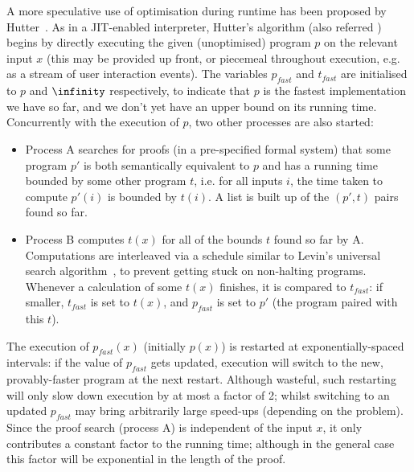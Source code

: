 A more speculative use of optimisation during runtime has been proposed by
Hutter~\iffalse TODO: Cite \fi. As in a JIT-enabled interpreter, Hutter's
algorithm (also referred \hsearch{}) begins by directly executing the given
(unoptimised) program $p$ on the relevant input $x$ (this may be provided up
front, or piecemeal throughout execution, e.g. as a stream of user interaction
events). The variables $p_{fast}$ and $t_{fast}$ are initialised to $p$ and
$\infinity$ respectively, to indicate that $p$ is the fastest implementation we
have so far, and we don't yet have an upper bound on its running
time. Concurrently with the execution of $p$, two other processes are also
started:

\begin{itemize}
\item Process A searches for proofs (in a pre-specified formal system) that some
  program $p\prime$ is both semantically equivalent to $p$ and has a running
  time bounded by some other program $t$, i.e. for all inputs $i$, the
  time taken to compute $p\prime(i)$ is bounded by $t(i)$. A list is built up of
  the $(p\prime, t)$ pairs found so far.
\item Process B computes $t(x)$ for all of the bounds $t$ found so far by A.
  Computations are interleaved via a schedule similar to Levin's universal
  search algorithm~\iffalse TODO: Cite \fi, to prevent getting stuck on
  non-halting programs. Whenever a calculation of some $t(x)$ finishes, it is
  compared to $t_{fast}$: if smaller, $t_{fast}$ is set to $t(x)$, and $p_{fast}$ is
  set to $p\prime$ (the program paired with this $t$).
\end{itemize}

The execution of $p_{fast}(x)$ (initially $p(x)$) is restarted at
exponentially-spaced intervals: if the value of $p_{fast}$ gets updated,
execution will switch to the new, provably-faster program at the next restart.
Although wasteful, such restarting will only slow down execution by at most a
factor of 2; whilst switching to an updated $p_{fast}$ may bring arbitrarily large
speed-ups (depending on the problem). Since the proof search (process A) is
independent of the input $x$, it only contributes a constant factor to the
running time; although in the general case this factor will be exponential in
the length of the proof.

